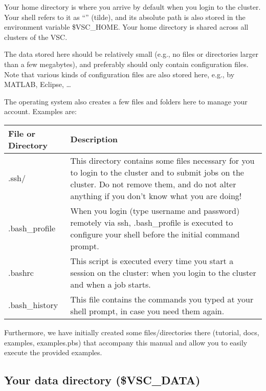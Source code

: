 Your home directory is where you arrive by default when you login to the
cluster. Your shell refers to it as ``\tilde'' (tilde), and its absolute path is also
stored in the environment variable \$VSC\_HOME. Your home directory is shared across
all clusters of the VSC.

The data stored here should be relatively small (e.g., no files or directories
larger than a few megabytes), and preferably should only contain configuration
files.
Note that various kinds of configuration files are also stored
here, e.g., by MATLAB, Eclipse, \ldots

The operating system also creates a few files and folders here to manage your
account. Examples are:

\begin{tabular}{|p{}|p{}|} \hline
\textbf{File or Directory} & \textbf{Description} \\ \hline
.ssh/                      & This directory contains some files necessary for you to login to the cluster and to submit jobs on the cluster. Do not remove them, and do not alter anything if you don't know what you are doing! \\ \hline
.bash\_profile             & When you login (type username and password) remotely via ssh, .bash\_profile is executed to configure your shell before the initial command prompt. \\ \hline
.bashrc                    & This script is executed every time you start a session on the cluster: when you login to the cluster and when a job starts. \\ \hline
.bash\_history             & This file contains the commands you typed at your shell prompt, in case you need them again. \\ \hline
\end{tabular}

\ifgent
\else
Furthermore, we have initially created some files/directories there (tutorial,
docs,  examples, examples.pbs) that accompany  this manual and allow you to
easily execute the provided examples.
\fi

\subsection{Your data directory (\$VSC\_DATA)\label{subsec:data-directory}}

